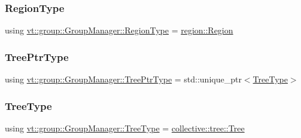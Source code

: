 \mbox{\label{structvt_1_1group_1_1_group_manager_a38876227e6077059a67a5d5e5647d8a3}} 
\subsubsection{\texorpdfstring{Region\+Type}{RegionType}}
{\footnotesize\ttfamily using \hyperlink{structvt_1_1group_1_1_group_manager_a38876227e6077059a67a5d5e5647d8a3}{vt\+::group\+::\+Group\+Manager\+::\+Region\+Type} =  \hyperlink{structvt_1_1group_1_1region_1_1_region}{region\+::\+Region}}

\mbox{\label{structvt_1_1group_1_1_group_manager_a9e0bcb0f3241a19b95d4f7fa092f4c8e}} 
\subsubsection{\texorpdfstring{Tree\+Ptr\+Type}{TreePtrType}}
{\footnotesize\ttfamily using \hyperlink{structvt_1_1group_1_1_group_manager_a9e0bcb0f3241a19b95d4f7fa092f4c8e}{vt\+::group\+::\+Group\+Manager\+::\+Tree\+Ptr\+Type} =  std\+::unique\+\_\+ptr$<$\hyperlink{structvt_1_1group_1_1_group_manager_a33ca642d5f42e39f033ed4f62613caef}{Tree\+Type}$>$}

\mbox{\label{structvt_1_1group_1_1_group_manager_a33ca642d5f42e39f033ed4f62613caef}} 
\subsubsection{\texorpdfstring{Tree\+Type}{TreeType}}
{\footnotesize\ttfamily using \hyperlink{structvt_1_1group_1_1_group_manager_a33ca642d5f42e39f033ed4f62613caef}{vt\+::group\+::\+Group\+Manager\+::\+Tree\+Type} =  \hyperlink{structvt_1_1collective_1_1tree_1_1_tree}{collective\+::tree\+::\+Tree}}



